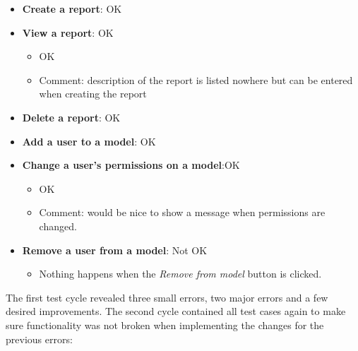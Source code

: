 \begin{itemize}
\begin{itemize}
    \end{itemize}
    \item \textbf{Create a report}: \textcolor{mutedGreen}{OK}
    \item \textbf{View a report}: \textcolor{mutedGreen}{OK}
    \begin{itemize}
        \item OK
        \item Comment: description of the report is listed nowhere but can be entered when creating the report
    \end{itemize}
    \item \textbf{Delete a report}: \textcolor{mutedGreen}{OK}
    \item \textbf{Add a user to a model}: \textcolor{mutedGreen}{OK}
    \item \textbf{Change a user's permissions on a model}:\textcolor{mutedGreen}{OK}
    \begin{itemize}
        \item OK
        \item Comment: would be nice to show a message when permissions are changed.
    \end{itemize}
    \item \textbf{Remove a user from a model}: \textcolor{mutedPeach}{Not OK}
    \begin{itemize}
        \item Nothing happens when the \textit{Remove from model} button is clicked.
    \end{itemize}
\end{itemize}

The first test cycle revealed three small errors, two major errors and a few desired improvements.
The second cycle contained all test cases again to make sure functionality was not broken when implementing the changes for the previous errors:

